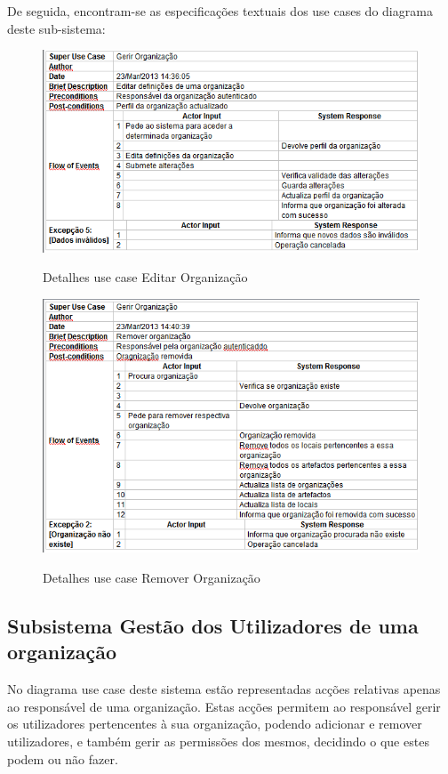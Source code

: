 \documentclass[12pt,a4paper]{article}
\begin{document}
De seguida, encontram-se as especificações textuais dos use cases do diagrama deste sub-sistema:\\

\begin{figure}[h!]
\centering
\includegraphics[scale=0.7]{d_usecase/editarorganizacao}
\label{usecase}
\caption{Detalhes use case Editar Organização}
\end{figure}

\begin{figure}[h!]
\centering
\includegraphics[scale=0.7]{d_usecase/removerorganizacao}
\label{usecase}
\caption{Detalhes use case Remover Organização}
\end{figure}

\clearpage

\subsection{Subsistema Gestão dos Utilizadores de uma organização}
No diagrama use case deste sistema estão representadas acções relativas apenas ao responsável de uma organização. Estas acções permitem ao responsável gerir os utilizadores pertencentes à sua organização, podendo adicionar e remover utilizadores, e também gerir as permissões dos mesmos, decidindo o que estes podem ou não fazer.\\
\end{document}
